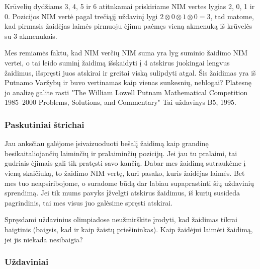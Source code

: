 Krūvelių dydžiams 3, 4, 5 ir 6 atitnkamai priskiriame NIM vertes lygias 2, 0, 1 ir 0. Pozicijos NIM vertė pagal trečiąjį uždavinį lygi $2\otimes 0\otimes 1\otimes 0=3$, tad matome, kad pirmasis žaidėjas laimės pirmuoju ėjimu paėmęs vieną akmenuką iš krūvelės su 3 akmenukais. 

\begin{pastaba}
Mes remiamės faktu, kad NIM verčių NIM suma yra lyg suminio žaidimo NIM vertei, o tai leido suminį žaidimą išskaidyti į 4 atskirus juokingai lengvus žaidimus, išspręsti juos atskirai ir greitai viską sulipdyti atgal. Šis žaidimas yra iš Putnamo Varžybų ir buvo vertinamas kaip vienas sunkesnių, neblogai? Platesnę jo analizę galite rasti "The William Lowell Putnam Mathematical Competition 1985–2000 Problems, Solutions, and Commentary" Tai uždavinys B5, 1995.
\end{pastaba}

\subsubsection{Paskutiniai štrichai}

\begin{pastaba}
Jau anksčiau galėjome įsivaizuoduoti bešalį žaidimą kaip grandinę besikaitaliojančių laiminčių ir pralaiminčių pozicijų. Jei jau tu pralaimi, tai gudriais ėjimais gali tik pratęsti savo kančią. Dabar mes žaidimą sutraukėme į vieną skaičiuką, to žaidimo NIM vertę, kuri pasako, kuris žaidėjas laimės. Bet mes tuo neapsiribojome, o suradome būdą dar labiau supaprastinti šių uždavinių sprendimą. Jei tik mums pavyks įžvelgti atskirus žaidimus, iš kurių susideda pagrindinis, tai mes visus juo galėsime spręsti atskirai. 
\end{pastaba}

\begin{pastaba}
Spręsdami uždavinius olimpiadose neužmirškite įrodyti, kad žaidimas tikrai
baigtinis (baigsis, kad ir kaip žaistų priešininkas). Kaip žaidėjui laimėti
žaidimą, jei jis niekada nesibaigia?
\end{pastaba}

\subsubsection{Uždaviniai}


